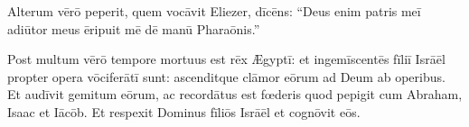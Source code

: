 Alterum vērō peperit, quem vocāvit Eliezer, dīcēns:
``Deus enim patris meī adiūtor meus ēripuit mē dē manū Pharaōnis.''

Post multum vērō tempore mortuus est rēx Ægyptī:
et ingemīscentēs fīliī Isrāēl
propter opera vōciferātī sunt:
ascenditque clāmor eōrum ad Deum ab operibus.
Et audīvit gemitum eōrum,
ac recordātus est fœderis quod pepigit cum Abraham, Isaac et Iācōb.
Et respexit Dominus fīliōs Isrāēl et cognōvit eōs.
